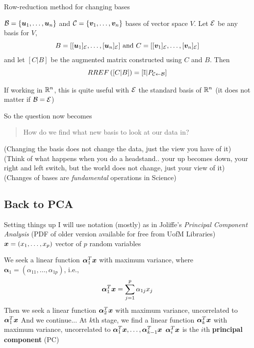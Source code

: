 \documentclass[aspectratio=169]{beamer}\usepackage[]{graphicx}\usepackage[]{xcolor}
\begin{document}
\begin{frame}{Row-reduction method for changing bases}
\begin{theorem}
\label{th:change-basis-construction}
$\mathcal{B}=\{\bm{u}_1,\ldots,\bm{u}_n\}$ and $\mathcal{C}=\{\bm{v}_1,\ldots,\bm{v}_n\}$ bases of vector space $V$. Let $\mathcal{E}$ be any basis for $V$,
\[
B = [[\bm{u}_1]_{\mathcal{E}},\ldots,[\bm{u}_n]_{\mathcal{E}}] 
\textrm{ and }
C = [[\bm{v}_1]_{\mathcal{E}},\ldots,[\bm{v}_n]_{\mathcal{E}}] 
\]
and let $[C|B]$ be the augmented matrix constructed using $C$ and $B$. Then
\[
RREF\left([C|B]\right)
=[\mathbb{I}|P_{\mathcal{C}\leftarrow\mathcal{B}}]
\]
\end{theorem}
\vfill
If working in $\mathbb{R}^n$, this is quite useful with $\mathcal{E}$ the standard basis of $\mathbb{R}^n$ (it does not matter if $\mathcal{B}=\mathcal{E}$)
\end{frame}

\begin{frame}
So the question now becomes
\begin{quote}
How do we find what new basis to look at our data in?
\end{quote}
\vfill
(Changing the basis does not change the data, just the view you have of it)
\vfill
(Think of what happens when you do a headstand.. your up becomes down, your right and left switch, but the world does not change, just your view of it)
\vfill
(Changes of bases are \emph{fundamental} operations in Science)
\end{frame}



\subsection{Back to PCA}
\begin{frame}{Setting things up}
I will use notation (mostly) as in Joliffe's \emph{Principal Component Analysis} (PDF of older version available for free from UofM Libraries)
\vfill
$\bm{x}=(x_1,\ldots,x_p)$ vector of $p$ random variables
\end{frame}


\begin{frame} 
We seek a linear function $\bm{\alpha}_1^T\bm{x}$ with maximum variance, where $\bm{\alpha}_1=(\alpha_{11},\ldots,\alpha_{1p})$, i.e.,
\[
\bm{\alpha}_1^T\bm{x} = \sum_{j=1}^p\alpha_{1j}x_j
\]
\vfill
Then we seek a linear function $\bm{\alpha}_2^T\bm{x}$ with maximum variance, uncorrelated to $\bm{\alpha}_1^T\bm{x}$
\vfill
And we continue...
\vfill
At $k$th stage, we find a linear function $\bm{\alpha}_k^T\bm{x}$ with maximum variance, uncorrelated to $\bm{\alpha}_1^T\bm{x},\ldots,\bm{\alpha}_{k-1}^T\bm{x}$
\vfill
$\bm{\alpha}_i^T\bm{x}$ is the $i$th \textbf{principal component} (PC)
\end{frame}
\end{document}
